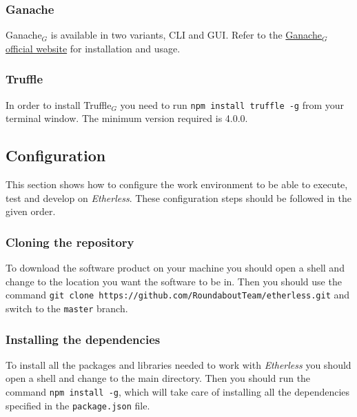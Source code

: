 \subsubsection{Ganache}
	Ganache$_{G}$ is available in two variants, CLI and GUI. Refer to the \href{https://www.trufflesuite.com/docs/ganache/quickstart}{Ganache$_{G}$ official website} for installation and usage.
\subsubsection{Truffle}
 In order to install Truffle$_{G}$ you need to run \texttt{npm install truffle -g} from your terminal window. The minimum version required is 4.0.0.
\subsection{Configuration}
This section shows how to configure the work environment to be able to execute, test and develop on \textit{Etherless}. These configuration steps should be followed in the given order.
\subsubsection{Cloning the repository}
To download the software product on your machine you should open a shell and change to the location you want the software to be in. Then you should use the command \texttt{git clone https://github.com/RoundaboutTeam/etherless.git} and switch to the \texttt{master} branch.
\subsubsection{Installing the dependencies}
To install all the packages and libraries needed to work with \textit{Etherless} you should open a shell and change to the main directory. Then you should run the command \texttt{npm install -g}, which will take care of installing all the dependencies specified in the \texttt{package.json} file.
